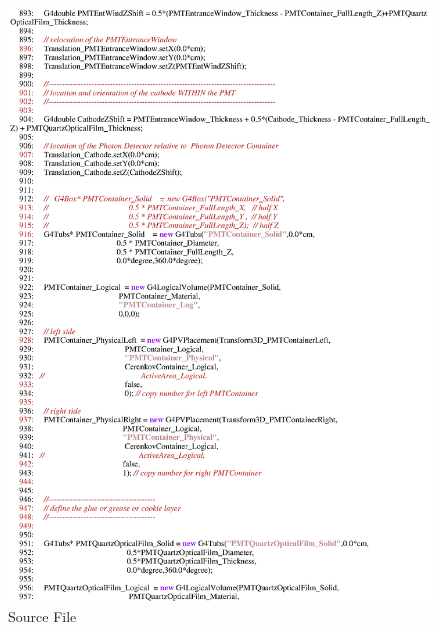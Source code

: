 \begin{figure}[ht]
  \hspace{0cm}
  \includegraphics[scale=0.8]{./figures5/QweakSimCerenkovDetector.cc-p15.eps}
  \caption{\label{SourceV15} Source File}
           \label{fig:V-SC-19}
\end{figure}
\clearpage


